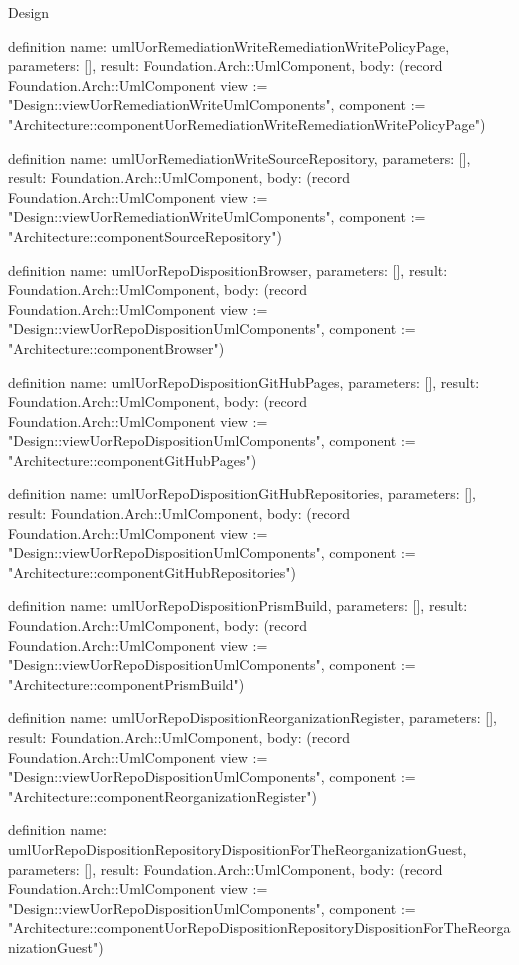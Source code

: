 \begin{lexlean}{Design}
\begin{semanticmodule}
definition{
  name: umlUorRemediationWriteRemediationWritePolicyPage,
  parameters: [],
  result: Foundation.Arch::UmlComponent,
  body: (record Foundation.Arch::UmlComponent {view := "Design::viewUorRemediationWriteUmlComponents", component := "Architecture::componentUorRemediationWriteRemediationWritePolicyPage"})
}

definition{
  name: umlUorRemediationWriteSourceRepository,
  parameters: [],
  result: Foundation.Arch::UmlComponent,
  body: (record Foundation.Arch::UmlComponent {view := "Design::viewUorRemediationWriteUmlComponents", component := "Architecture::componentSourceRepository"})
}

definition{
  name: umlUorRepoDispositionBrowser,
  parameters: [],
  result: Foundation.Arch::UmlComponent,
  body: (record Foundation.Arch::UmlComponent {view := "Design::viewUorRepoDispositionUmlComponents", component := "Architecture::componentBrowser"})
}

definition{
  name: umlUorRepoDispositionGitHubPages,
  parameters: [],
  result: Foundation.Arch::UmlComponent,
  body: (record Foundation.Arch::UmlComponent {view := "Design::viewUorRepoDispositionUmlComponents", component := "Architecture::componentGitHubPages"})
}

definition{
  name: umlUorRepoDispositionGitHubRepositories,
  parameters: [],
  result: Foundation.Arch::UmlComponent,
  body: (record Foundation.Arch::UmlComponent {view := "Design::viewUorRepoDispositionUmlComponents", component := "Architecture::componentGitHubRepositories"})
}

definition{
  name: umlUorRepoDispositionPrismBuild,
  parameters: [],
  result: Foundation.Arch::UmlComponent,
  body: (record Foundation.Arch::UmlComponent {view := "Design::viewUorRepoDispositionUmlComponents", component := "Architecture::componentPrismBuild"})
}

definition{
  name: umlUorRepoDispositionReorganizationRegister,
  parameters: [],
  result: Foundation.Arch::UmlComponent,
  body: (record Foundation.Arch::UmlComponent {view := "Design::viewUorRepoDispositionUmlComponents", component := "Architecture::componentReorganizationRegister"})
}

definition{
  name: umlUorRepoDispositionRepositoryDispositionForTheReorganizationGuest,
  parameters: [],
  result: Foundation.Arch::UmlComponent,
  body: (record Foundation.Arch::UmlComponent {view := "Design::viewUorRepoDispositionUmlComponents", component := "Architecture::componentUorRepoDispositionRepositoryDispositionForTheReorganizationGuest"})
}


\end{semanticmodule}
\end{lexlean}
